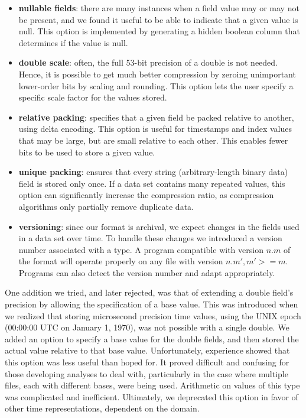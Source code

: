 \documentclass{acm_proc_article-sp}
\begin{document}
\begin{itemize}

\item \textbf{nullable fields}: there are many instances when a field
value may or may not be present, and we found it useful to be able to
indicate that a given value is null. This option is implemented by
generating a hidden boolean column that determines if the value is null.

\item \textbf{double scale}: often, the full 53-bit precision of a double
is not needed. Hence, it is possible to get
much better compression by zeroing unimportant 
lower-order bits 
by scaling and rounding. This option lets the user specify
a specific scale factor for the values stored.

\item \textbf{relative packing}: specifies that a given field be packed
relative to another, using delta encoding. This option is useful
for timestamps and index values that may be large, but are small
relative to each other. This enables fewer bits to be used to store a
given value.

\item \textbf{unique packing}: ensures that every string 
(arbitrary-length binary data) field is stored only once. If a 
data set
contains many repeated values, this option can significantly increase
the 
compression ratio, as compression algorithms only partially
remove duplicate data.

\item \textbf{versioning}: since our format is archival, we expect
changes in the fields used in a data set over time.  To handle these
changes we 
introduced a version number associated with a type.
A program compatible with version $n.m$ of the format will operate
properly on any file with version $n.m', m' >= m$.  Programs can also
detect the version number and adapt appropriately.

\end{itemize}

One addition we tried, and later rejected, was that of extending a
double field's
precision by allowing the specification of a base value.
This was introduced when we realized that storing microsecond precision
time values, using the UNIX epoch (00:00:00 UTC on January 1, 1970),
was not possible with a single double. We added an option to
specify a base value for the double fields, and then stored the actual
value relative to that base value.
Unfortunately, experience showed that this option
was less useful than hoped for. It proved difficult and confusing for
those developing analyses to deal with, particularly in the case where
multiple files, each with different bases, were being used. Arithmetic
on values of this type was complicated and inefficient. Ultimately, we
deprecated this option in favor of other time representations,
dependent on the domain. 
\end{document}
